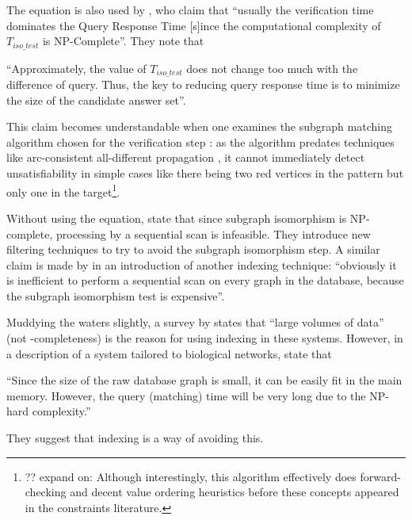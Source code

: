 \documentclass[twoside,11pt]{article}
\newcommand{\citet}[1]{\citeA{#1}}
\newcommand{\citep}[1]{\cite{#1}}
\begin{document}
The equation is also used by \citet{DBLP:conf/icde/JiangWYZ07}, who claim that ``usually the
verification time dominates the Query Response Time [s]ince the computational complexity of
$T_{\mathit{iso\_test}}$ is NP-Complete''. They note that \begin{displayquote}``Approximately, the
    value of $T_{\mathit{iso\_test}}$ does not change too much with the difference of query. Thus,
the key to reducing query response time is to minimize the size of the candidate answer
set''.\end{displayquote} This claim becomes understandable when one examines the subgraph matching
algorithm chosen for the verification step \citep{DBLP:journals/jacm/Ullmann76}: as the algorithm
predates techniques like arc-consistent all-different propagation \citep{DBLP:conf/aaai/Regin94}, it
cannot immediately detect unsatisfiability in simple cases like there being two red vertices in the
pattern but only one in the target\footnote{?? expand on: Although interestingly, this algorithm
effectively does forward-checking and decent value ordering heuristics before these concepts
appeared in the constraints literature.}.

Without using the equation, \citet{DBLP:conf/sigmod/ChengKNL07} state that since subgraph
isomorphism is NP-complete, processing by a sequential scan is infeasible. They introduce new
filtering techniques to try to avoid the subgraph isomorphism step. A similar claim is made by
\citet{DBLP:conf/icde/ZhangHY07} in an introduction of another indexing technique: ``obviously it is
inefficient to perform a sequential scan on every graph in the database, because the subgraph
isomorphism test is expensive''.

Muddying the waters slightly, a survey by \citet{DBLP:journals/datamine/HanCXY07} states that
``large volumes of data'' (not \NP-completeness) is the reason for using indexing in these systems.
However, in a description of a system tailored to biological networks,
\citet{DBLP:conf/edbt/ZhangLY09} state that \begin{displayquote}``Since the size of the raw database
    graph is small, it can be easily fit in the main memory.  However, the query (matching) time
will be very long due to the NP-hard complexity.''\end{displayquote} They suggest that indexing is
a way of avoiding this.
\end{document}
